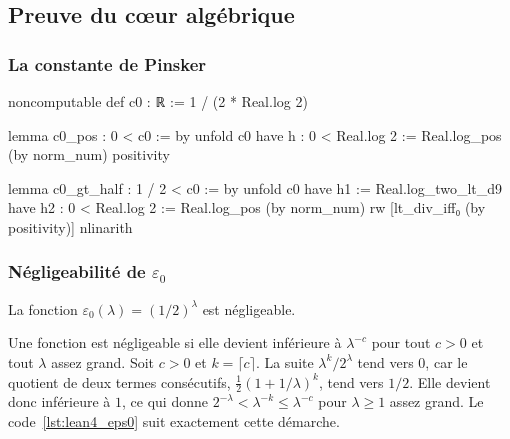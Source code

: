 \subsection{Preuve du c\oe ur alg\'ebrique}
\label{subsec:preuve_coeur_algebrique}
\begin{sloppypar}
\subsubsection{La constante de Pinsker}
\label{subsubsec:constante_pinsker}

\begin{leancode}[caption={D\'efinition et propri\'et\'es de la constante $c_0 = 1/(2\ln 2)$}, label={lst:lean4_c0}]
noncomputable def c0 : ℝ := 1 / (2 * Real.log 2)

lemma c0_pos : 0 < c0 := by
  unfold c0
  have h : 0 < Real.log 2 := Real.log_pos (by norm_num)
  positivity

lemma c0_gt_half : 1 / 2 < c0 := by
  unfold c0
  have h1 := Real.log_two_lt_d9
  have h2 : 0 < Real.log 2 := Real.log_pos (by norm_num)
  rw [lt_div_iff₀ (by positivity)]
  nlinarith
\end{leancode}

\subsubsection{N\'egligeabilit\'e de $\varepsilon_0$}
\label{subsubsec:negligeabilite_eps0}

\begin{lemma}\label{lem:negligeabilite_eps0}
La fonction $\varepsilon_0(\lambda) = (1/2)^\lambda$ est
n\'egligeable.
\end{lemma}

\begin{Preuve}
Une fonction est n\'egligeable si elle devient inf\'erieure \`a $\lambda^{-c}$ pour
tout $c > 0$ et tout $\lambda$ assez grand. Soit $c > 0$ et $k = \lceil c\rceil$.
La suite $\lambda^k/2^\lambda$ tend vers $0$, car le quotient de deux termes
cons\'ecutifs, $\tfrac12(1+1/\lambda)^k$, tend vers $1/2$. Elle devient donc
inf\'erieure \`a $1$, ce qui donne $2^{-\lambda} < \lambda^{-k} \leq \lambda^{-c}$ pour
$\lambda \geq 1$ assez grand. Le code~\ref{lst:lean4_eps0} suit exactement cette
d\'emarche.
\end{Preuve}


\end{sloppypar}

